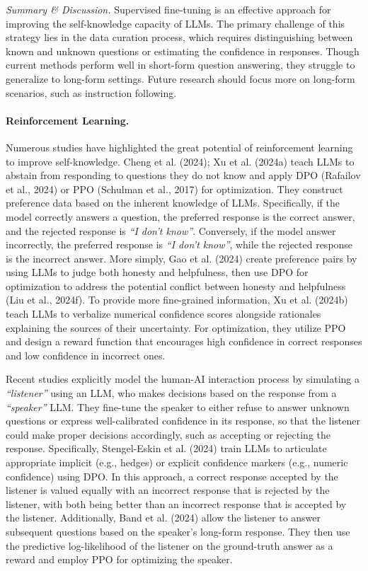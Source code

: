 \emph{Summary \& Discussion.} Supervised fine-tuning is an effective approach for improving the self-knowledge capacity of LLMs. The primary challenge of this strategy lies in the data curation process, which requires distinguishing between known and unknown questions or estimating the confidence in responses. Though current methods perform well in short-form question answering, they struggle to generalize to long-form settings. Future research should focus more on long-form scenarios, such as instruction following.

\paragraph{Reinforcement Learning.} Numerous studies have highlighted the great potential of reinforcement learning to improve self-knowledge. Cheng et al. (2024); Xu et al. (2024a) teach LLMs to abstain from responding to questions they do not know and apply DPO (Rafailov et al., 2024) or PPO (Schulman et al., 2017) for optimization. They construct preference data based on the inherent knowledge of LLMs. Specifically, if the model correctly answers a question, the preferred response is the correct answer, and the rejected response is \emph{``I don't know''}. Conversely, if the model answer incorrectly, the preferred response is \emph{``I don't know''}, while the rejected response is the incorrect answer. More simply, Gao et al. (2024) create preference pairs by using LLMs to judge both honesty and helpfulness, then use DPO for optimization to address the potential conflict between honesty and helpfulness (Liu et al., 2024f). To provide more fine-grained information, Xu et al. (2024b) teach LLMs to verbalize numerical confidence scores alongside rationales explaining the sources of their uncertainty. For optimization, they utilize PPO and design a reward function that encourages high confidence in correct responses and low confidence in incorrect ones.

Recent studies explicitly model the human-AI interaction process by simulating a \emph{``listener''} using an LLM, who makes decisions based on the response from a \emph{``speaker''} LLM. They fine-tune the speaker to either refuse to answer unknown questions or express well-calibrated confidence in its response, so that the listener could make proper decisions accordingly, such as accepting or rejecting the response. Specifically, Stengel-Eskin et al. (2024) train LLMs to articulate appropriate implicit (e.g., hedges) or explicit confidence markers (e.g., numeric confidence) using DPO. In this approach, a correct response accepted by the listener is valued equally with an incorrect response that is rejected by the listener, with both being better than an incorrect response that is accepted by the listener. Additionally, Band et al. (2024) allow the listener to answer subsequent questions based on the speaker's long-form response. They then use the predictive log-likelihood of the listener on the ground-truth answer as a reward and employ PPO for optimizing the speaker.

